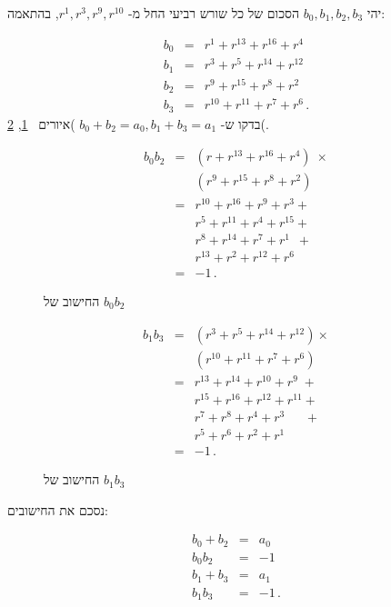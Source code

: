 יהי
$b_0,b_1,b_2,b_3$
הסכום של כל שורש רביעי החל מ-%
$r^1,r^3,r^9,r^{10}$,
בהתאמה:

\begin{eqnarray*}
b_0&=& r^1+ r^{13} + r^{16} + r^4\\
b_1&=& r^3+ r^{5} + r^{14} + r^{12}\\
b_2&=& r^9+ r^{15} + r^{8} + r^2\\
b_3&=& r^{10}+ r^{11} + r^{7} + r^6\,.
\end{eqnarray*}
בדקו ש-%
$b_0+b_2=a_0, b_1+b_3=a_1$
)איורים~%
\ref{f.b0b2}, \ref{f.b1b3}(.
\begin{figure}

\begin{eqnarray*}
b_0b_2&=&(r + r^{13} + r^{16} +r^4)\;\times\\
&&(r^9 + r^{15} + r^{8} +r^{2})\\
&=& r^{10}+r^{16}+r^9+r^3+\\
&& r^{5}+r^{11}+r^4+r^{15}+\\
&& r^{8}+r^{14}+r^7+r^1\;\:+\\
&& r^{13}+r^{2}+r^{12}+r^6\\
&=&-1\,.
\end{eqnarray*}
\caption{החישוב של $b_0b_2$}\label{f.b0b2}
\end{figure}
\begin{figure}

\begin{eqnarray*}
b_1b_3&=&(r^3 + r^{5} + r^{14} +r^{12})\times\\
&&(r^{10} + r^{11} + r^{7} +r^{6})\\
&=& r^{13}+r^{14}+r^{10}+r^9\;+\\
&& r^{15}+r^{16}+r^{12}+r^{11}+\\
&& r^{7}+r^{8}+r^4+r^3\quad\;\;+\\
&& r^{5}+r^{6}+r^{2}+r^1\\
&=&-1\,.
\end{eqnarray*}
\caption{החישוב של $b_1b_3$}\label{f.b1b3}
\end{figure}

נסכם את החישובים:

\begin{eqnarray*}
b_0+b_2&=&a_0\\
b_0b_2&=&-1\\
b_1+b_3&=&a_1\\
b_1b_3&=&-1\,.
\end{eqnarray*}



